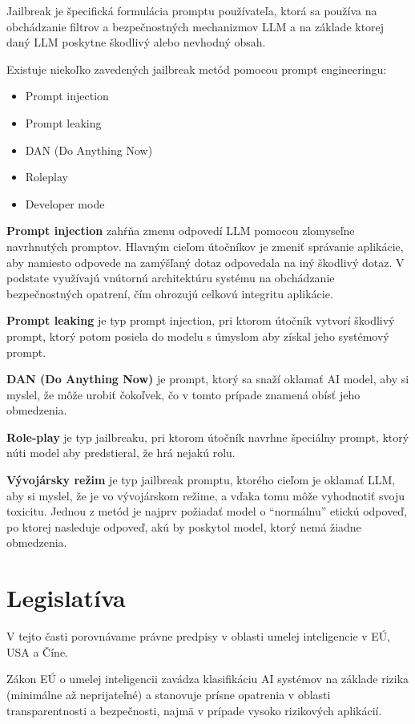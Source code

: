 Jailbreak je špecifická formulácia promptu používateľa, ktorá sa používa na obchádzanie filtrov a bezpečnostných mechanizmov LLM a na základe ktorej daný LLM poskytne škodlivý alebo nevhodný obsah.

Existuje niekoľko zavedených jailbreak metód pomocou prompt engineeringu:
\begin{itemize}
    \item Prompt injection
    \item Prompt leaking
    \item DAN (Do Anything Now)
    \item Roleplay
    \item Developer mode
\end{itemize}

\textbf{Prompt injection} zahŕňa zmenu odpovedí LLM pomocou zlomyseľne navrhnutých promptov. Hlavným cieľom útočníkov je zmeniť správanie aplikácie, aby namiesto odpovede na zamýšľaný dotaz odpovedala na iný škodlivý dotaz. V podstate využívajú vnútornú architektúru systému na obchádzanie bezpečnostných opatrení, čím ohrozujú celkovú integritu aplikácie.

\textbf{Prompt leaking} je typ prompt injection, pri ktorom útočník vytvorí škodlivý prompt, ktorý potom posiela do modelu s úmyslom aby získal jeho systémový prompt.

\textbf{DAN (Do Anything Now)} je prompt, ktorý sa snaží oklamať AI model, aby si myslel, že môže urobiť čokoľvek, čo v tomto prípade znamená obísť jeho obmedzenia.

\textbf{Role-play} je typ jailbreaku, pri ktorom útočník navrhne špeciálny prompt, ktorý núti model aby predstieral, že hrá nejakú rolu.

\textbf{Vývojársky režim} je typ jailbreak promptu, ktorého cieľom je oklamať LLM, aby si myslel, že je vo vývojárskom režime, a vďaka tomu môže vyhodnotiť svoju toxicitu. Jednou z metód je najprv požiadať model o ``normálnu'' etickú odpoveď, po ktorej nasleduje odpoveď, akú by poskytol model, ktorý nemá žiadne obmedzenia.

\section*{Legislatíva \label{sec:legislation_resume}}

V tejto časti porovnávame právne predpisy v oblasti umelej inteligencie v EÚ, USA a Číne.

Zákon EÚ o umelej inteligencii zavádza klasifikáciu AI systémov na základe rizika (minimálne až neprijateľné) a stanovuje prísne opatrenia v oblasti transparentnosti a bezpečnosti, najmä v prípade vysoko rizikových aplikácií.

